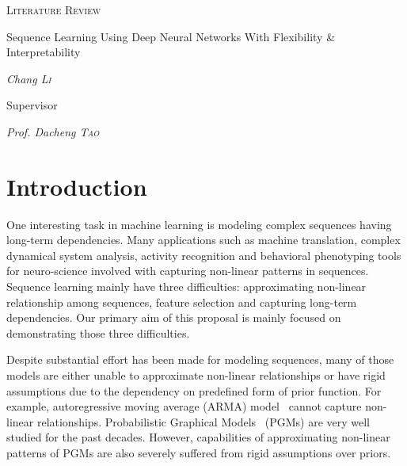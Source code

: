 \documentclass{article} \usepackage{tabularx}
\begin{document}
\begin{titlepage}
	\centering
	\begin{figure}[H]
    \centering
	\end{figure}
	\vspace{2cm} {\scshape\LARGE Literature Review\par}
  \vspace{2cm}
  
	{\scshape\LARGE

    Sequence Learning Using Deep Neural Networks With Flexibility
    \& Interpretability
    
    \par} {\huge\bfseries \par}
	
	\vspace{2cm} {\Large\itshape Chang \textsc{Li}\par} \vfill

  {\Large Supervisor\par} {\Large\itshape Prof. Dacheng
    \textsc{Tao}\par} \vfill

\end{titlepage}


\section{Introduction}
\label{sec:intro}

One interesting task in machine learning is modeling complex
sequences having long-term dependencies. Many applications such
as machine translation, complex dynamical system analysis,
activity recognition and behavioral phenotyping tools for
neuro-science involved with capturing non-linear patterns in
sequences. Sequence learning mainly have three difficulties:
approximating non-linear relationship among sequences, feature
selection and capturing long-term dependencies. Our primary aim
of this proposal is mainly focused on demonstrating those three
difficulties. 

Despite substantial effort has been made for modeling sequences,
many of those models are either unable to approximate non-linear
relationships or have rigid assumptions due to the dependency on
predefined form of prior function. For example, autoregressive
moving average (ARMA) model~\cite{hibon1997arma} cannot capture
non-linear relationships. Probabilistic Graphical
Models~\cite{murphy2012machine,koller2009probabilistic} (PGMs)
are very well studied for the past decades. However, capabilities
of approximating non-linear patterns of PGMs are also severely
suffered from rigid assumptions over priors.
\end{document}
